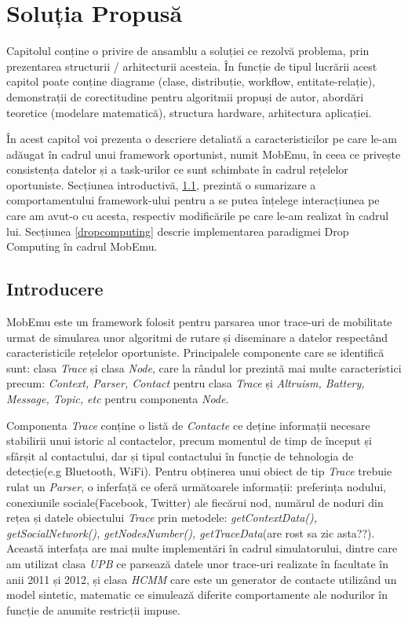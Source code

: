 \documentclass[12pt,a4paper]{report}
\begin{document}
\chapter{Soluția Propusă}
Capitolul conține o privire de ansamblu a soluției ce rezolvă problema, prin prezentarea structurii / arhitecturii acesteia. În funcție de tipul lucrării acest capitol poate conține diagrame (clase, distribuție, workflow, entitate-relație), demonstrații de corectitudine pentru algoritmii propuși de autor, abordări teoretice (modelare matematică), structura hardware, arhitectura aplicației.

În acest capitol voi prezenta o descriere detaliată a caracteristicilor pe care le-am adăugat în cadrul unui framework oportunist, numit MobEmu, în ceea ce privește consistența datelor și a task-urilor ce sunt schimbate în cadrul rețelelor oportuniste. 
Secțiunea introductivă, \ref{introducere}, prezintă o sumarizare a comportamentului framework-ului pentru a se putea înțelege interacțiunea pe care am avut-o cu acesta, respectiv modificările pe care le-am realizat în cadrul lui. Secțiunea \ref{dropcomputing} descrie implementarea paradigmei Drop Computing în cadrul MobEmu.

\section{Introducere} \label{introducere}
MobEmu este un framework folosit pentru parsarea unor trace-uri de mobilitate urmat de simularea unor algoritmi de rutare și diseminare a datelor respectând caracteristicile rețelelor oportuniste. Principalele componente care se identifică sunt:  clasa \textit{Trace} și clasa \textit{Node}, care la rândul lor prezintă mai multe caracteristici precum: \textit{Context, Parser, Contact} pentru clasa \textit{Trace} și \textit{Altruism, Battery, Message, Topic, etc} pentru componenta \textit{Node}.

Componenta \textit{Trace} conține o listă de \textit{Contacte} ce deține informații necesare stabilirii unui istoric al contactelor, precum momentul de timp de început și sfârșit al contactului, dar și tipul contactului în funcție de tehnologia de detecție(e.g Bluetooth, WiFi). Pentru obținerea unui obiect de tip \textit{Trace} trebuie rulat un \textit{Parser}, o inferfață ce oferă următoarele informații: preferința nodului, conexiunile sociale(Facebook, Twitter) ale fiecărui nod, numărul de noduri din rețea și datele obiectului \textit{Trace} prin metodele: \textit{getContextData(), getSocialNetwork(), getNodesNumber(), getTraceData}(are rost sa zic asta??). Această interfața are mai multe implementări în cadrul simulatorului, dintre care am utilizat clasa \textit{UPB} ce parsează datele unor trace-uri realizate în facultate în anii 2011 și 2012, și clasa \textit{HCMM} care este un generator de contacte utilizând un model sintetic, matematic ce simulează diferite comportamente ale nodurilor în funcție de anumite restricții impuse.
\end{document}
